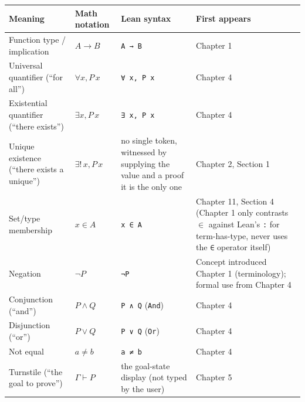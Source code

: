 \begin{longtable}[]{@{}
  >{\raggedright\arraybackslash}p{}
  >{\raggedright\arraybackslash}p{}
  >{\raggedright\arraybackslash}p{}
  >{\raggedright\arraybackslash}p{}@{}}
\toprule\noalign{}
\begin{minipage}[b]{\linewidth}\raggedright
Meaning
\end{minipage} & \begin{minipage}[b]{\linewidth}\raggedright
Math notation
\end{minipage} & \begin{minipage}[b]{\linewidth}\raggedright
Lean syntax
\end{minipage} & \begin{minipage}[b]{\linewidth}\raggedright
First appears
\end{minipage} \\
\midrule\noalign{}
\endhead
\bottomrule\noalign{}
\endlastfoot
Function type / implication & \(A \to B\) & \texttt{A → B} & Chapter 1 \\
Universal quantifier (``for all'') & \(\forall x, P\, x\) & \texttt{∀ x, P x} & Chapter 4 \\
Existential quantifier (``there exists'') & \(\exists x, P\, x\) & \texttt{∃ x, P x} & Chapter 4 \\
Unique existence (``there exists a unique'') & \(\exists!\, x, P\, x\) & no single token, witnessed by supplying the value and a proof it is the only one & Chapter 2, Section 1 \\
Set/type membership & \(x \in A\) & \texttt{x ∈ A} & Chapter 11, Section 4 (Chapter 1 only contrasts \(\in\) against Lean's \texttt{:} for term-has-type, never uses the \texttt{∈} operator itself) \\
Negation & \(\neg P\) & \texttt{¬P} & Concept introduced Chapter 1 (terminology); formal use from Chapter 4 \\
Conjunction (``and'') & \(P \wedge Q\) & \texttt{P ∧ Q} (\texttt{And}) & Chapter 4 \\
Disjunction (``or'') & \(P \vee Q\) & \texttt{P ∨ Q} (\texttt{Or}) & Chapter 4 \\
Not equal & \(a \neq b\) & \texttt{a ≠ b} & Chapter 4 \\
Turnstile (``the goal to prove'') & \(\Gamma \vdash P\) & the goal-state display (not typed by the user) & Chapter 5 \\
\end{longtable}

